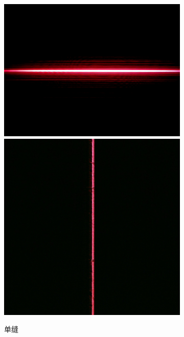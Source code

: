 \documentclass[a4paper]{article}
\begin{document}
\begin{figure}[htbp]
    \begin{subfigure}[htbp]{0.3\textwidth}
        \centering
        \includegraphics[width=\textwidth]{fre-done/2-7.JPG}
        \includegraphics[width=\textwidth]{img-done/2-7.JPG}
        \caption{单缝}
        \label{2-7}
    \end{subfigure}
    \begin{subfigure}[htbp]{0.3\textwidth}

\end{subfigure}
\end{figure}
\end{document}
